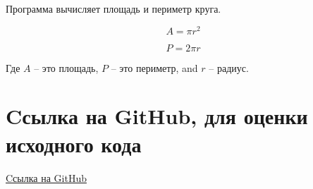 \documentclass{article}
\begin{document}
Программа вычисляет площадь и периметр круга.

\begin{equation}
A = \pi r^2
\end{equation}

\begin{equation}
P = 2\pi r
\end{equation}

Где $A$ -- это площадь, $P$ -- это периметр, and $r$ -- радиус.

\section{Cсылка на GitHub, для оценки исходного кода}

\href{https://github.com/Razboynik-Vlad/geometric_lib}{Cсылка на GitHub}
\end{document}
